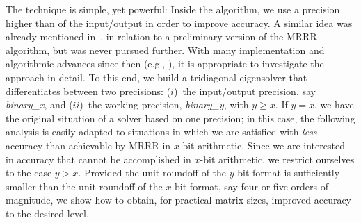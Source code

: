 \documentclass[final]{siamltex}
\newcommand{\binaryx}{{\it binary\_\hspace*{1pt}x}}
\newcommand{\binaryy}{{\it binary\_\hspace*{0pt}y}}
\begin{document}
The technique is simple, yet powerful: Inside the algorithm, 
we use a precision higher than of the input/output in order to improve accuracy. 
A similar idea was already mentioned in~\cite{Dhillon:Diss},
in relation to a preliminary version of the MRRR algorithm,
but was never pursued further.
With many implementation and algorithmic advances since then (e.g.,
\cite{NLA:NLA493,Dhillon05gluedmatrices,Bientinesi:2005:PMR3,Willems:twisted,Willems:blocked}),  
it is appropriate to  
investigate the approach in detail.
To this end, we build a tridiagonal eigensolver that 
differentiates between two precisions: ($i$)~the  
input/output precision, say \binaryx, and ($ii$)~the working precision,
\binaryy, with $y \geq x$. If $y = x$, we have the original 
situation of a solver based on one precision; in this case, the following analysis
is easily adapted to situations in which we are satisfied with {\em less} accuracy
than achievable by MRRR in $x$-bit arithmetic. Since we are interested in accuracy that
cannot be accomplished in $x$-bit arithmetic, we
restrict ourselves to the case $y > x$. Provided the unit roundoff of the $y$-bit format is
sufficiently smaller than the unit roundoff of the $x$-bit format, say four
or five orders of magnitude, we show how to obtain, for practical matrix sizes, improved
accuracy to the desired level. 
\end{document}

